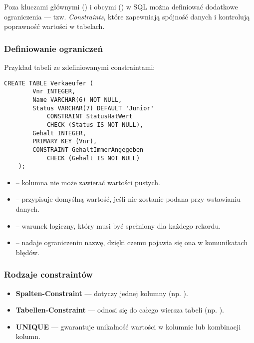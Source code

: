     Poza kluczami głównymi () i obcymi () w SQL można definiować 
    dodatkowe ograniczenia — tzw. \textit{Constraints}, które zapewniają spójność danych i 
    kontrolują poprawność wartości w tabelach.

\subsubsection{Definiowanie ograniczeń}

    Przykład tabeli ze zdefiniowanymi constraintami:
    \begin{lstlisting}[style=sqlstyle]
    CREATE TABLE Verkaeufer (
        Vnr INTEGER,
        Name VARCHAR(6) NOT NULL,
        Status VARCHAR(7) DEFAULT 'Junior'
            CONSTRAINT StatusHatWert
            CHECK (Status IS NOT NULL),
        Gehalt INTEGER,
        PRIMARY KEY (Vnr),
        CONSTRAINT GehaltImmerAngegeben
            CHECK (Gehalt IS NOT NULL)
    );
    \end{lstlisting}

    \begin{itemize}
        \item {} – kolumna nie może zawierać wartości pustych.
        \item {} – przypisuje domyślną wartość, jeśli nie zostanie podana przy wstawianiu danych.
        \item {} – warunek logiczny, który musi być spełniony dla każdego rekordu.
        \item {} – nadaje ograniczeniu nazwę, dzięki czemu pojawia się ona w komunikatach błędów.
    \end{itemize}

\subsubsection{Rodzaje constraintów}
    \begin{itemize}
        \item \textbf{Spalten-Constraint} — dotyczy jednej kolumny (np. ).
        \item \textbf{Tabellen-Constraint} — odnosi się do całego wiersza tabeli (np. ).
        \item \textbf{UNIQUE} — gwarantuje unikalność wartości w kolumnie lub kombinacji kolumn.
    \end{itemize}

